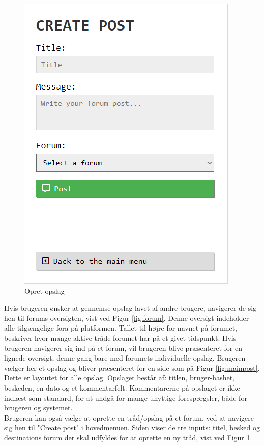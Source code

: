 \begin{table}[H]
\begin{minipage}{.33\textwidth}
\begin{figure}[H]
            \includegraphics[width=0.95\linewidth]{Projectdoc/Assets/Illustrationer/send.png}
            \caption{Opret opslag}
            \label{fig:sendpost}
        \end{figure}
    \end{minipage}
\end{table}

Hvis brugeren ønsker at gennemse opslag lavet af andre brugere, navigerer de sig hen til forums oversigten, vist ved Figur \ref{fig:forum}. Denne oversigt indeholder alle tilgængelige fora på platformen. Tallet til højre for navnet på forumet, beskriver hvor mange aktive tråde forumet har på et givet tidspunkt. Hvis brugeren navigerer sig ind på et forum, vil brugeren blive præsenteret for en lignede oversigt, denne gang bare med forumets individuelle opslag. Brugeren vælger her et opslag og bliver præsenteret for en side som på Figur \ref{fig:mainpost}. Dette er layoutet for alle opslag. Opslaget består af: titlen, bruger-hashet, beskeden, en dato og et kommentarfelt. Kommentarerne på opslaget er ikke indlæst som standard, for at undgå for mange unyttige forespørgsler, både for brugeren og systemet.\\
Brugeren kan også vælge at oprette en tråd/opslag på et forum, ved at navigere sig hen til "Create post" i hovedmenuen. Siden viser de tre inputs: titel, besked og destinations forum der skal udfyldes for at oprette en ny tråd, vist ved Figur \ref{fig:sendpost}.